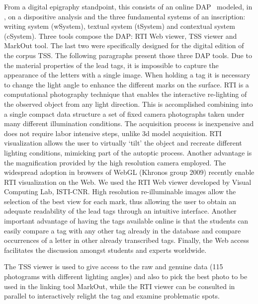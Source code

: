 \documentclass[amsthm,ebook]{saparticle}
\begin{document}
From a digital epigraphy standpoint, this consists of an online DAP \ modeled, in \citet{lame_primary_2014}, on a dispositive analysis
and the three fundamental systems of an inscription: writing system (wSystem), textual system (tSystem) and contextual
system (cSystem). Three tools compose the DAP: RTI Web viewer, TSS viewer and MarkOut tool. The last two were
specifically designed for the digital edition of the corpus TSS. The following paragraphs present those three DAP
tools. Due to the material properties of the lead tags, it is impossible to capture the appearance of the letters with
a single image. When holding a tag it is necessary to change the light angle to enhance the different marks on the
surface. RTI is a computational photography technique that enables the interactive re-lighting of the observed object
from any light direction. This is accomplished combining into a single compact data structure a set of fixed camera
photographs taken under many different illumination conditions. The acquisition process is inexpensive and does not
require labor intensive steps, unlike 3d model acquisition. RTI visualization allows the user to virtually ‘tilt’ the
object and recreate different lighting conditions, mimicking part of the autoptic process. Another advantage is the
magnification provided by the high resolution camera employed. The widespread adoption in browsers of WebGL (Khronos
group 2009) recently enable RTI visualization on the Web. We used the RTI Web viewer developed by Visual Computing Lab,
ISTI-CNR. High resolution re-illuminable images allow the selection of the best view for each mark, thus allowing the
user to obtain an adequate readability of the lead tags through an intuitive interface. Another important advantage of
having the tags available online is that the students can easily compare a tag with any other tag already in the
database and compare occurrences of a letter in other already transcribed tags. Finally, the Web access facilitates the
discussion amongst students and experts worldwide.

The TSS viewer is used to give access to the raw and genuine data (115 photograms with different lighting angles) and
also to pick the best photo to be used in the linking tool MarkOut, while the RTI viewer can be consulted in parallel
to interactively relight the tag and examine problematic spots.
\end{document}
